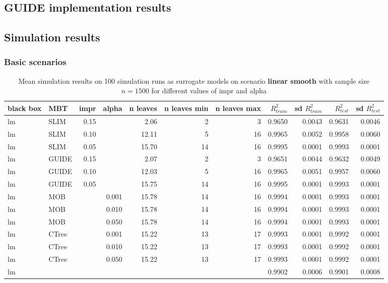 \subsection{GUIDE implementation results}



\subsection{Simulation results}
\subsubsection{Basic scenarios}
\begin{table}

\caption{Mean simulation results on 100 simulation runs as surrogate models on scenario \textbf{linear smooth} with sample size $n = 1500$ for different values of impr and alpha}
\centering \tiny
\begin{tabular}[t]{l|l|r|r|r|r|r|r|r|r|r}
\hline
black box & MBT & impr & alpha & n leaves & n leaves min & n leaves max &  $R^2_{train}$ & sd $R^2_{train}$ & $R^2_{test}$ & sd $R^2_{test}$\\
\hline
lm & SLIM & 0.15 & & 2.06 & 2 & 3 & 0.9650 & 0.0043 & 0.9631 & 0.0046\\
lm & SLIM & 0.10 & & 12.11 & 5 & 16 & 0.9965 & 0.0052 & 0.9958 & 0.0060\\
lm & SLIM & 0.05 & & 15.70 & 14 & 16 & 0.9995 & 0.0001 & 0.9993 & 0.0001\\
lm & GUIDE & 0.15 & & 2.07 & 2 & 3 & 0.9651 & 0.0044 & 0.9632 & 0.0049\\
lm & GUIDE & 0.10 & & 12.03 & 5 & 16 & 0.9965 & 0.0051 & 0.9957 & 0.0060\\
lm & GUIDE & 0.05 & & 15.75 & 14 & 16 & 0.9995 & 0.0001 & 0.9993 & 0.0001\\
lm & MOB & & 0.001 & 15.78 & 14 & 16 & 0.9994 & 0.0001 & 0.9993 & 0.0001\\
lm & MOB & & 0.010 & 15.78 & 14 & 16 & 0.9994 & 0.0001 & 0.9993 & 0.0001\\
lm & MOB & & 0.050 & 15.78 & 14 & 16 & 0.9994 & 0.0001 & 0.9993 & 0.0001\\
lm & CTree & & 0.001 & 15.22 & 13 & 17 & 0.9993 & 0.0001 & 0.9992 & 0.0001\\
lm & CTree & & 0.010 & 15.22 & 13 & 17 & 0.9993 & 0.0001 & 0.9992 & 0.0001\\
lm & CTree & & 0.050 & 15.22 & 13 & 17 & 0.9993 & 0.0001 & 0.9992 & 0.0001\\
\hline
lm &  & & & & &  & 0.9902 & 0.0006 & 0.9901 & 0.0008\\
\hline


\end{tabular}
\end{table}
